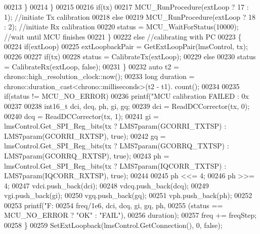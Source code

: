 \begin{DoxyCode}
00213                 \}
00214             \}
00215 
00216             \textcolor{keywordflow}{if}(tx)
00217                 MCU_RunProcedure(extLoop ? 17 : 1); \textcolor{comment}{//initiate Tx calibration}
00218             \textcolor{keywordflow}{else}
00219                 MCU_RunProcedure(extLoop ? 18 : 2); \textcolor{comment}{//initiate Rx calibration}
00220             status = MCU_WaitForStatus(10000); \textcolor{comment}{//wait until MCU finishes}
00221         \}
00222         \textcolor{keywordflow}{else} \textcolor{comment}{//calibrating with PC}
00223         \{
00224             \textcolor{keywordflow}{if}(extLoop)
00225                 extLoopbackPair = GetExtLoopPair(lmsControl, tx);
00226 
00227             \textcolor{keywordflow}{if}(tx)
00228                 status = CalibrateTx(extLoop);
00229             \textcolor{keywordflow}{else}
00230                 status = CalibrateRx(extLoop, \textcolor{keyword}{false});
00231         \}
00232         \textcolor{keyword}{auto} t2 = chrono::high\_resolution\_clock::now();
00233         \textcolor{keywordtype}{long} duration = chrono::duration\_cast<chrono::milliseconds>(t2 - t1).
      count();
00234 
00235         \textcolor{keywordflow}{if}(status != MCU_NO_ERROR)
00236             printf(\textcolor{stringliteral}{"MCU calibration FAILED : 0x%
00237 
00238         int16\_t dci, dcq, ph, gi, gq;
00239         dci = ReadDCCorrector(tx, 0);
00240         dcq = ReadDCCorrector(tx, 1);
00241         gi = lmsControl.Get_SPI_Reg_bits(tx ? LMS7param(GCORRI_TXTSP) : 
      LMS7param(GCORRI_RXTSP), \textcolor{keyword}{true});
00242         gq = lmsControl.Get_SPI_Reg_bits(tx ? LMS7param(GCORRQ_TXTSP) : 
      LMS7param(GCORRQ_RXTSP), \textcolor{keyword}{true});
00243         ph = lmsControl.Get_SPI_Reg_bits(tx ? LMS7param(IQCORR_TXTSP) : 
      LMS7param(IQCORR_RXTSP), \textcolor{keyword}{true});
00244 
00245         ph <<= 4;
00246         ph >>= 4;
00247         vdci.push\_back(dci);
00248         vdcq.push\_back(dcq);
00249         vgi.push\_back(gi);
00250         vgq.push\_back(gq);
00251         vph.push\_back(ph);
00252 
00253         printf(\textcolor{stringliteral}{"F: %
00254             freq/1e6, dci, dcq, gi, gq, ph,
00255             (status == MCU_NO_ERROR ? \textcolor{stringliteral}{"OK"} : \textcolor{stringliteral}{"FAIL"}),
00256             duration);
00257         freq += freqStep;
00258     \}
00259     SetExtLoopback(lmsControl.GetConnection(), 0, \textcolor{keyword}{false});
}}
\end{DoxyCode}
